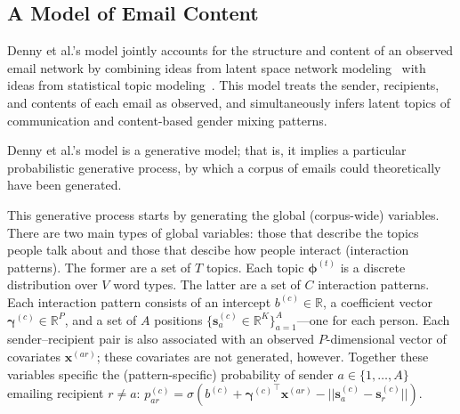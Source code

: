 \documentclass{pnastwo}
\newcommand{\bs}{\boldsymbol{s}}
\newcommand{\bx}{\boldsymbol{x}}
\newcommand{\bgamma}{\boldsymbol{\gamma}}
\newcommand{\bphi}{\boldsymbol{\phi}}
\begin{document}
\begin{article}


\subsection{A Model of Email Content}

Denny et al.'s model jointly accounts for the structure and content of
an observed email network by combining ideas from latent space network
modeling~\cite{Hoff2002a} with ideas from statistical topic
modeling~\cite{Blei2003}. This model treats the sender, recipients,
and contents of each email as observed, and simultaneously infers
latent topics of communication and content-based gender mixing
patterns.

Denny et al.'s model is a generative model; that is, it implies a
particular probabilistic generative process, by which a corpus of
emails could theoretically have been generated.

This generative process starts by generating the global (corpus-wide)
variables. There are two main types of global variables: those that
describe the topics people talk about and those that descibe how
people interact (interaction patterns). The former are a set of $T$
topics. Each topic $\bphi^{(t)}$ is a discrete distribution over $V$
word types. The latter are a set of $C$ interaction patterns. Each
interaction pattern consists of an intercept $b^{(c)} \in \mathbb{R}$,
a coefficient vector $\bgamma^{(c)} \in \mathbb{R}^P$, and a set of
$A$ positions $\{ \bs^{(c)}_a \in \mathbb{R}^K \}_{a=1}^A$---one for
each person. Each sender--recipient pair is also associated with an
observed $P$-dimensional vector of covariates $\bx^{(ar)}$; these
covariates are not generated, however. Together these variables
specific the (pattern-specific) probability of sender $a \in \{1,
\ldots, A\}$ emailing recipient $r \neq a$: $p^{(c)}_{ar} =
\sigma(b^{(c)} + {\bgamma^{(c)}}^{\top} \bx^{(ar)} - ||\bs_{a}^{(c)} -
\bs_{r}^{(c)}||)$.


\end{article}
\end{document}
